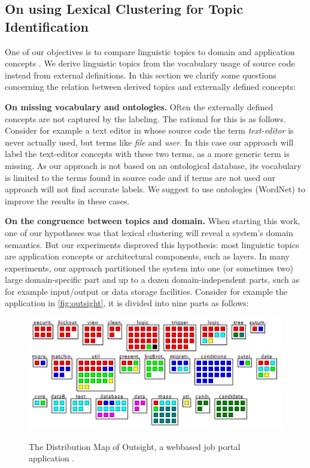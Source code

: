 \subsection{On using Lexical Clustering for Topic Identification}

One of our objectives is to compare linguistic topics to domain and application concepts \cite{Bigg93a}. We derive linguistic topics from the vocabulary usage of source code instead from external definitions. In this section we clarify some questions concerning the relation between derived topics and externally defined concepts:

\textbf{On missing vocabulary and ontologies.} Often the externally defined concepts are not captured by the labeling. The rational for this is as follows. Consider for example a text editor in whose source code the term \emph{text-editor} is never actually used, but terms like \emph{file} and \emph{user}. In this case our approach will label the text-editor concepts with these two terms, as a more generic term is missing. As our approach is not based on an ontological database, its vocabulary is limited to the terms found in source code and if terms are not used our approach will not find accurate labels. We suggest to use ontologies (\ie WordNet) to improve the results in these cases.

\textbf{On the congruence between topics and domain.} When starting this work, one of our hypotheses was that lexical clustering will reveal a system's domain semantics. But our experiments disproved this hypothesis: most linguistic topics are application concepts or architectural components, such as layers. In many experiments, our approach partitioned the system into one (or sometimes two) large domain-specific part and up to a dozen domain-independent parts, such as for example input/output or data storage facilities. Consider for example the application in \autoref{fig:outsight}, it is divided into nine parts as follows:

\begin{figure}[h]
  \includegraphics[width=\linewidth]{fig/hapax-outsight-distribution}\\
  \caption{The Distribution Map of Outsight, a webbased job portal application \cite{Kuhn06a}.}\label{fig:outsight}
\end{figure}

